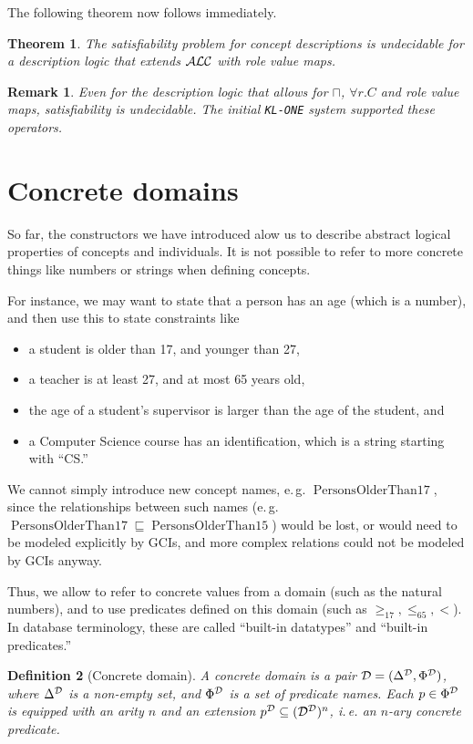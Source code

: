 \documentclass[openany]{scrbook}
\theoremstyle{break}
\newtheorem{Theorem}{Theorem}[chapter]
\newtheorem{Definition}[Theorem]{Definition}
\theoremstyle{nonumberbreak}
\newtheorem{Remark}{Remark}
\theoremstyle{nonumberplain}
\theoremstyle{nonumberbreak}
\newcommand{\ie}{i{.}\,e{.}\xspace}
\newcommand{\eg}{e{.}\,g{.}\xspace}
\newcommand{\ALC}{{\cal A}{\cal L}{\cal C}}
\begin{document}
 The following theorem now follows immediately.
 \begin{Theorem}
   \label{7.5}
   The satisfiability problem for concept descriptions is undecidable
   for a description logic that extends $\ALC$ with role value maps.
 \end{Theorem}

 \begin{Remark}
   Even for the description logic that allows for $\sqcap$, $\forall
   r.C$ and role value maps, satisfiability is undecidable. The
   initial \texttt{KL-ONE} system supported these operators.
 \end{Remark}

\section{Concrete domains}
So far, the constructors we have introduced alow us to describe
abstract logical properties of concepts and individuals. It is not
possible to refer to more concrete things like numbers or strings when
defining concepts.

For instance, we may want to state that a person has an age (which is
a number), and then use this to state constraints like
\begin{itemize}
\item a student is older than 17, and younger than 27,
\item a teacher is at least 27, and at most 65 years old,
\item the age of a student's supervisor is larger than the age of the
  student, and
\item a Computer Science course has an identification, which is a
  string starting with ``CS.''
\end{itemize}

We cannot simply introduce new concept names, \eg
$\operatorname{PersonsOlderThan17}$, since the relationships between
such names (\eg $\operatorname{PersonsOlderThan17} \sqsubseteq
\operatorname{PersonsOlderThan15}$) would be lost, or would need to be
modeled explicitly by GCIs, and more complex relations could not be
modeled by GCIs anyway.

Thus, we allow to refer to concrete values from a domain (such as the
natural numbers), and to use predicates defined on this domain (such
as $\geq_{17}, \leq_{65}, <$). In database terminology, these are
called ``built-in datatypes'' and ``built-in predicates.''

\begin{Definition}[Concrete domain]
  \label{7.6}
  A concrete domain is a pair ${\cal D} = (\Delta^{\cal D}, \Phi^{\cal
    D})$, where $\Delta^{\cal D}$ is a non-empty set, and $\Phi^{\cal
    D}$ is a set of predicate names. Each $p \in \Phi^{\cal D}$ is
  equipped with an arity $n$ and an extension $p^{\cal D} \subseteq
  ({\cal D}^{\cal D})^n$, \ie an $n$-ary concrete predicate.
\end{Definition}
\end{document}
